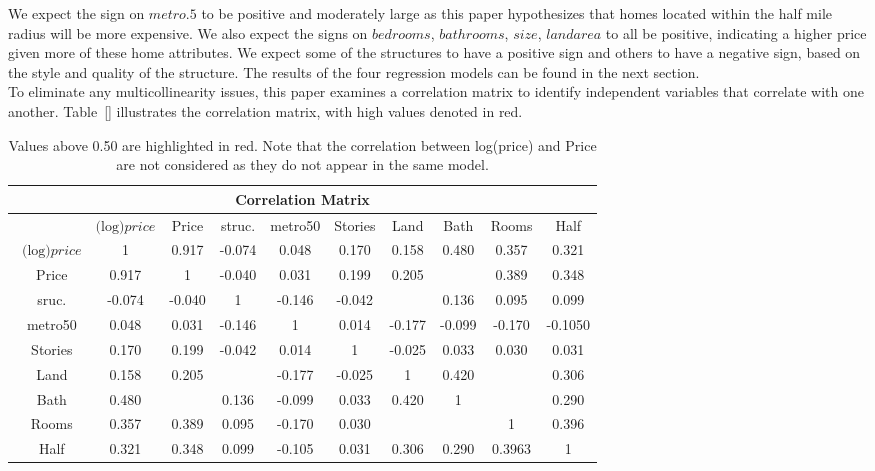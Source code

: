 \documentclass[12pt]{report}
\newcommand\tab[1][.60cm]{\hspace*{#1}}
\begin{document}
\tab We expect the sign on $metro.5$ to be positive and moderately large as this paper hypothesizes that homes located within the half mile radius will be more expensive. We also expect the signs on $bedrooms$, $bathrooms$, $size$, $landarea$ to all be positive, indicating a higher price given more of these home attributes. We expect some of the structures to have a positive sign and others to have a negative sign, based on the style and quality of the structure. The results of the four regression models can be found in the next section.\\
\tab To eliminate any multicollinearity issues, this paper examines a correlation matrix to identify independent variables that correlate with one another. Table~\ref{} illustrates the correlation matrix, with high values denoted in red.
\begin{table}[h!]
\centering
\begin{tabular}{|c| c | c |c |c |c |c |c | c | c|} 
\hline
\multicolumn{10}{|c|}{ \textbf{Correlation Matrix}} \\
\hline\hline
&$\text{(log)}price$& Price& struc. & metro50& Stories& Land& Bath& Rooms& Half\\[0.5ex] \hline \ 
$\text{(log)}price$& 1& 0.917& -0.074& 0.048& 0.170& 0.158& 0.480 & 0.357& 0.321\\ [0.5ex]\hline \ 
Price& 0.917& 1&-0.040& 0.031& 0.199& 0.205& \textbf{\color{red}{0.524}}& 0.389& 0.348\\ [0.5ex]\hline\ 
sruc.& -0.074& -0.040 & 1& -0.146& -0.042 & \textbf{\color{red}{0.505}}& 0.136& 0.095& 0.099 \\ [0.5ex]\hline \ 
metro50& 0.048 & 0.031&-0.146& 1& 0.014& -0.177& -0.099& -0.170& -0.1050\\ [0.5ex] \hline \ 
Stories& 0.170 & 0.199&-0.042& 0.014& 1& -0.025& 0.033& 0.030& 0.031\\ [0.5ex]\hline \ 
Land& 0.158& 0.205&\textbf{\color{red}{0.505}}& -0.177& -0.025& 1& 0.420 & \textbf{\color{red}{0.505}}& 0.306\\ [0.5ex] \hline \ 
Bath& 0.480& \textbf{\color{red}{0.524}}&0.136& -0.099& 0.033& 0.420&1& \textbf{\color{red}{0.694}}& 0.290\\ [0.5ex]\hline \ 
Rooms& 0.357& 0.389&0.095 & -0.170& 0.030& \textbf{\color{red}{0.506}}& \textbf{\color{red}{0.694}}& 1& 0.396 \\ [0.5ex]\hline \ 
Half& 0.321& 0.348&0.099& -0.105& 0.031& 0.306& 0.290& 0.3963& 1 \\ [0.5ex]\hline
\hline
\end{tabular}
\caption{\footnotesize Values above 0.50 are highlighted in red. Note that the correlation between log(price) and Price are not considered as they do not appear in the same model.}
\label{table:1}
\end{table}
\end{document}

